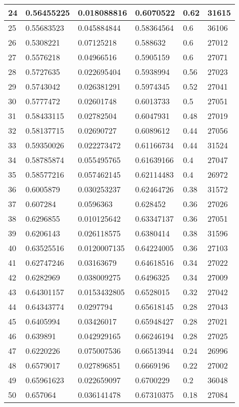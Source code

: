 \begin{longtable}{|l|l|l|l|l|l|}
24 & 0.56455225 & 0.018088816 & 0.6070522 & 0.62 & 31615 \\ \hline 
25 & 0.55683523 & 0.045884844 & 0.58364564 & 0.6 & 36106 \\ \hline 
26 & 0.5308221 & 0.07125218 & 0.588632 & 0.6 & 27012 \\ \hline 
27 & 0.5576218 & 0.04966516 & 0.5905159 & 0.6 & 27071 \\ \hline 
28 & 0.5727635 & 0.022695404 & 0.5938994 & 0.56 & 27023 \\ \hline 
29 & 0.5743042 & 0.026381291 & 0.5974345 & 0.52 & 27041 \\ \hline 
30 & 0.5777472 & 0.02601748 & 0.6013733 & 0.5 & 27051 \\ \hline 
31 & 0.58433115 & 0.02782504 & 0.6047931 & 0.48 & 27019 \\ \hline 
32 & 0.58137715 & 0.02690727 & 0.6089612 & 0.44 & 27056 \\ \hline 
33 & 0.59350026 & 0.022273472 & 0.61166734 & 0.44 & 31524 \\ \hline 
34 & 0.58785874 & 0.055495765 & 0.61639166 & 0.4 & 27047 \\ \hline 
35 & 0.58577216 & 0.057462145 & 0.62114483 & 0.4 & 26972 \\ \hline 
36 & 0.6005879 & 0.030253237 & 0.62464726 & 0.38 & 31572 \\ \hline 
37 & 0.607284 & 0.0596363 & 0.628452 & 0.36 & 27026 \\ \hline 
38 & 0.6296855 & 0.010125642 & 0.63347137 & 0.36 & 27051 \\ \hline 
39 & 0.6206143 & 0.026118575 & 0.6380414 & 0.38 & 31596 \\ \hline 
40 & 0.63525516 & 0.0120007135 & 0.64224005 & 0.36 & 27103 \\ \hline 
41 & 0.62747246 & 0.03163679 & 0.64618516 & 0.34 & 27022 \\ \hline 
42 & 0.6282969 & 0.038009275 & 0.6496325 & 0.34 & 27009 \\ \hline 
43 & 0.64301157 & 0.0153432805 & 0.6528015 & 0.32 & 27042 \\ \hline 
44 & 0.64343774 & 0.0297794 & 0.65618145 & 0.28 & 27043 \\ \hline 
45 & 0.6405994 & 0.03426017 & 0.65948427 & 0.28 & 27021 \\ \hline 
46 & 0.639891 & 0.042929165 & 0.66246194 & 0.28 & 27025 \\ \hline 
47 & 0.6220226 & 0.075007536 & 0.66513944 & 0.24 & 26996 \\ \hline 
48 & 0.6579017 & 0.027896851 & 0.6669196 & 0.22 & 27002 \\ \hline 
49 & 0.65961623 & 0.022659097 & 0.6700229 & 0.2 & 36048 \\ \hline 
50 & 0.657064 & 0.036141478 & 0.67310375 & 0.18 & 27084 \\ \hline 
\end{longtable}